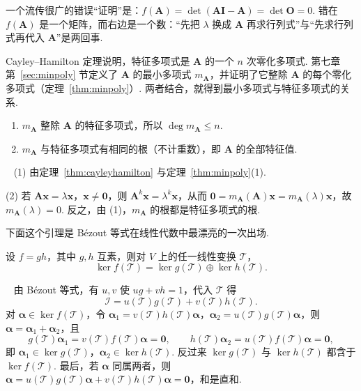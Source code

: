 \documentclass[lang=cn,10.5pt,scheme=chinese,toc=twocol,section,chinesefont=nofont,
twoside,citestyle=gb7714-2015,bibstyle=gb7714-2015]{elegantbook}
\DeclareRobustCommand{\textbf}[1]{{\lnsemiboldlatin\lnsemiboldcjk #1}}
\newcommand{\vv}[1]{\boldsymbol{#1}}
\newcommand{\zero}{\boldsymbol{0}}          %
\numberwithin{equation}{section}   %
\newcommand*{\lnlabel}[1]{{\sffamily\bfseries\color{black}#1}}
\renewenvironment{proof}{%
	\par\noindent\lnlabel{\proofname}\;\ \color{black!90}\cfs}{\par}
\begin{document}
\begin{pitfallbox}
  一个流传很广的错误“证明”是：$f(\vv A)=\det(\vv A\vv I-\vv A)=\det\vv O=0$. 错在 $f(\vv A)$ 是一个\textbf{矩阵}，而右边是一个\textbf{数}：“先把 $\lambda$ 换成 $\vv A$ 再求行列式”与“先求行列式再代入 $\vv A$”是两回事.
\end{pitfallbox}

Cayley–Hamilton 定理说明，特征多项式是 $\vv A$ 的一个 $n$ 次零化多项式. 第七章第~\ref{sec:minpoly} 节定义了 $\vv A$ 的最小多项式 $m_{\vv A}$，并证明了它整除 $\vv A$ 的每个零化多项式（定理~\ref{thm:minpoly}）. 两者结合，就得到最小多项式与特征多项式的关系.

\begin{proposition}
  \label{prop:minpolyeig}
  \begin{enumerate}
    \item $m_{\vv A}$ 整除 $\vv A$ 的特征多项式，所以 $\deg m_{\vv A}\le n$.
    \item $m_{\vv A}$ 与特征多项式有相同的根（不计重数），即 $\vv A$ 的全部特征值.
  \end{enumerate}
\end{proposition}
\begin{proof}
  (1) 由定理~\ref{thm:cayleyhamilton} 与定理~\ref{thm:minpoly}(1).

  (2) 若 $\vv{Ax}=\lambda\vv x$，$\vv x\ne\zero$，则 $\vv A^k\vv x=\lambda^k\vv x$，从而 $\zero=m_{\vv A}(\vv A)\vv x=m_{\vv A}(\lambda)\vv x$，故 $m_{\vv A}(\lambda)=0$. 反之，由 (1)，$m_{\vv A}$ 的根都是特征多项式的根.
\end{proof}

下面这个引理是 Bézout 等式在线性代数中最漂亮的一次出场.

\begin{lemma}[核分解引理]\label{lem:kerdecomp}
  设 $f=gh$，其中 $g,h$ 互素，则对 $V$ 上的任一线性变换 $\mathscr T$，
  \[\ker f(\mathscr T)=\ker g(\mathscr T)\oplus\ker h(\mathscr T).\]
\end{lemma}
\begin{proof}
  由 Bézout 等式，有 $u,v$ 使 $ug+vh=1$，代入 $\mathscr T$ 得
  \[\mathscr I=u(\mathscr T)g(\mathscr T)+v(\mathscr T)h(\mathscr T).\]
  对 $\vv\alpha\in\ker f(\mathscr T)$，令 $\vv\alpha_1=v(\mathscr T)h(\mathscr T)\vv\alpha$，$\vv\alpha_2=u(\mathscr T)g(\mathscr T)\vv\alpha$，则 $\vv\alpha=\vv\alpha_1+\vv\alpha_2$，且
  \[g(\mathscr T)\vv\alpha_1=v(\mathscr T)f(\mathscr T)\vv\alpha=\zero,\qquad h(\mathscr T)\vv\alpha_2=u(\mathscr T)f(\mathscr T)\vv\alpha=\zero,\]
  即 $\vv\alpha_1\in\ker g(\mathscr T)$，$\vv\alpha_2\in\ker h(\mathscr T)$. 反过来 $\ker g(\mathscr T)$ 与 $\ker h(\mathscr T)$ 都含于 $\ker f(\mathscr T)$. 最后，若 $\vv\alpha$ 同属两者，则 $\vv\alpha=u(\mathscr T)g(\mathscr T)\vv\alpha+v(\mathscr T)h(\mathscr T)\vv\alpha=\zero$，和是直和.
\end{proof}
\end{document}
